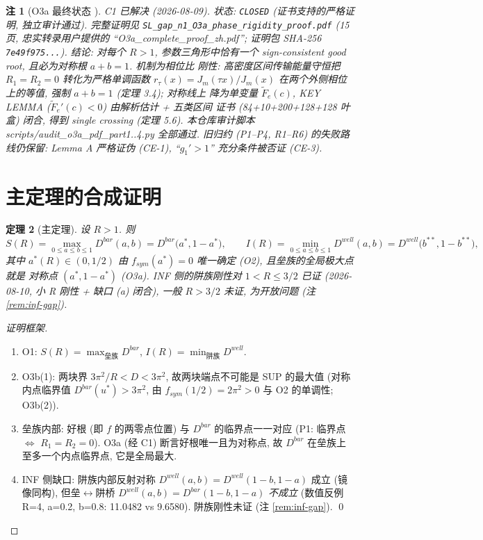 \documentclass[UTF8]{ctexart}
\newtheorem{theorem}{定理}[section]
\newtheorem{remark}[theorem]{注}
\begin{document}
\begin{remark}[O3a 最终状态 \label{rem:o3a-final}]
C1 已\emph{解决} (2026-08-09). 状态: \texttt{CLOSED} (证书支持的严格证明, 独立审计通过).
完整证明见 \texttt{SL\_gap\_n1\_O3a\_phase\_rigidity\_proof.pdf} (15 页, 忠实转录用户提供的
``O3a\_complete\_proof\_zh.pdf''; 证明包 SHA-256 \texttt{7e49f975...}). 结论: 对每个 $R>1$,
参数三角形中恰有一个 sign-consistent good root, 且必为对称根 $a+b=1$. 机制为\emph{相位比
刚性}: 高密度区间传输能量守恒把 $R_1=R_2=0$ 转化为严格单调函数
$r_\tau(x)=J_m(\tau x)/J_m(x)$ 在两个外侧相位上的等值, 强制 $a+b=1$ (定理 3.4); 对称线上
降为单变量 $\widetilde F_e(c)$, KEY LEMMA ($\widetilde F_e'(c)<0$) 由解析估计 + 五类区间
证书 (84+10+200+128+128 叶盒) 闭合, 得到 single crossing (定理 5.6). 本仓库审计脚本
scripts/audit\_o3a\_pdf\_part1..4.py 全部通过. 旧归约 (P1--P4, R1--R6) 的失败路线仍保留:
Lemma A 严格证伪 (CE-1), ``$g_1'>1$'' 充分条件被否证 (CE-3).
\end{remark}
\section{主定理的合成证明}

\begin{theorem}[主定理]
设 $R>1$. 则
\begin{equation}
	S(R)=\max_{0\le a\le b\le1}D^{bar}(a,b)=D^{bar}\bigl(a^*,1-a^*\bigr),
	\qquad
	I(R)=\min_{0\le a\le b\le1}D^{well}(a,b)=D^{well}\bigl(b^{**},1-b^{**}\bigr),
\end{equation}
其中 $a^*(R)\in(0,1/2)$ 由 $f_{sym}(a^*)=0$ 唯一确定 (O2), 且垒族的全局极大点就是
对称点 $(a^*,1-a^*)$ (O3a). INF 侧的阱族刚性对 $1<R\le3/2$ 已证 (2026-08-10, 小 R 刚性 + 缺口 (a) 闭合), 一般 $R>3/2$ 未证, 为开放问题 (注 \ref{rem:inf-gap}).
\end{theorem}

\begin{proof}[证明框架]
\begin{enumerate}
	\item O1: $S(R)=\max_{\text{垒族}}D^{bar}$, $I(R)=\min_{\text{阱族}}D^{well}$.
	\item O3b(1): 两块界 $3\pi^2/R<D<3\pi^2$, 故两块端点不可能是 SUP 的最大值
	(对称内点临界值 $D^{bar}(u^*)>3\pi^2$, 由 $f_{sym}(1/2)=2\pi^2>0$ 与 O2 的单调性;
	O3b(2)).
	\item 垒族内部: 好根 (即 $f$ 的两零点位置) 与 $D^{bar}$ 的临界点一一对应
	(P1: 临界点 $\iff$ $R_1=R_2=0$). O3a (经 C1) 断言好根唯一且为对称点,
	故 $D^{bar}$ 在垒族上至多一个内点临界点, 它是全局最大.
	\item INF 侧缺口: 阱族内部反射对称 $D^{well}(a,b)=D^{well}(1-b,1-a)$ 成立 (镜像同构), 但垒$\leftrightarrow$阱桥 $D^{well}(a,b)=D^{bar}(1-b,1-a)$ \emph{不成立} (数值反例 R=4, a=0.2, b=0.8: 11.0482 vs 9.6580). 阱族刚性未证 (注 \ref{rem:inf-gap}). \qed
\end{enumerate}
\end{proof}
\end{document}
